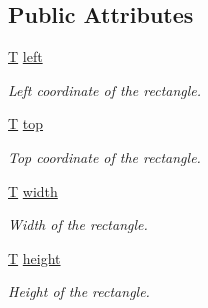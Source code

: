 \subsection*{Public Attributes}
\begin{DoxyCompactItemize}
\item 
\hyperlink{curses_8priv_8h_a5ef253115820acf7d27f3c5c3b02a0f0}{T} \hyperlink{classsf_1_1_rect_aa49960fa465103d9cb7069ceb25c7c32}{left}
\begin{DoxyCompactList}\small\item\em Left coordinate of the rectangle. \end{DoxyCompactList}\item 
\hyperlink{curses_8priv_8h_a5ef253115820acf7d27f3c5c3b02a0f0}{T} \hyperlink{classsf_1_1_rect_abd3d3a2d0ad211ef0082bd0aa1a5c0e3}{top}
\begin{DoxyCompactList}\small\item\em Top coordinate of the rectangle. \end{DoxyCompactList}\item 
\hyperlink{curses_8priv_8h_a5ef253115820acf7d27f3c5c3b02a0f0}{T} \hyperlink{classsf_1_1_rect_a4dd5b9d4333bebbc51bd309298fd500f}{width}
\begin{DoxyCompactList}\small\item\em Width of the rectangle. \end{DoxyCompactList}\item 
\hyperlink{curses_8priv_8h_a5ef253115820acf7d27f3c5c3b02a0f0}{T} \hyperlink{classsf_1_1_rect_a6fa0fc7de1636d78cae1a1b54eef95cd}{height}
\begin{DoxyCompactList}\small\item\em Height of the rectangle. \end{DoxyCompactList}\end{DoxyCompactItemize}
